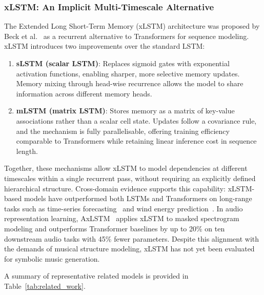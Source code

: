 \documentclass[conference]{IEEEtran}
\begin{document}
\subsubsection{xLSTM: An Implicit Multi-Timescale Alternative}
The Extended Long Short-Term Memory (xLSTM) architecture was proposed
by Beck et al.~\cite{beck2024} as a recurrent alternative to
Transformers for sequence modeling. xLSTM introduces two improvements
over the standard LSTM:

\begin{enumerate}
    \item \textbf{sLSTM (scalar LSTM)}: Replaces sigmoid gates with
    exponential activation functions, enabling sharper, more selective
    memory updates. Memory mixing through head-wise recurrence allows
    the model to share information across different memory heads.
    \item \textbf{mLSTM (matrix LSTM)}: Stores memory as a matrix of
    key-value associations rather than a scalar cell state. Updates
    follow a covariance rule, and the mechanism is fully parallelisable,
    offering training efficiency comparable to Transformers while
    retaining linear inference cost in sequence length.
\end{enumerate}

Together, these mechanisms allow xLSTM to model dependencies at
different timescales within a single recurrent pass, without requiring
an explicitly defined hierarchical structure. Cross-domain evidence
supports this capability: xLSTM-based models have outperformed both
LSTMs and Transformers on long-range tasks such as time-series
forecasting~\cite{alharthi2024} and wind energy
prediction~\cite{kraus2024xl}. In audio representation learning,
AxLSTM~\cite{axlstm2024} applies xLSTM to masked spectrogram modeling
and outperforms Transformer baselines by up to 20\% on ten downstream
audio tasks with 45\% fewer parameters. Despite this alignment with the
demands of musical structure modeling, xLSTM has not yet been evaluated
for symbolic music generation.

A summary of representative related models is provided in
Table~\ref{tab:related_work}.
\end{document}
